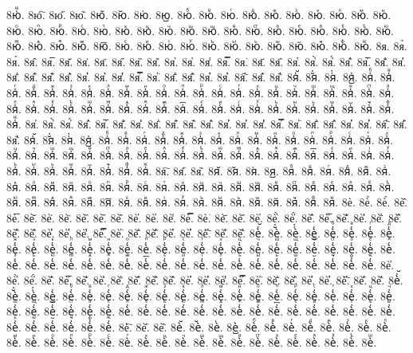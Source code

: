 {8ю҆ꚟ.
8ю҇.
8ю᷀.
8ю᷁.
8ю᷶.
8ю᷷.
8ю᷸.
8ю᷹.
8юⷠ.
8юⷡ.
8юⷢ.
8юⷣ.
8юⷤ.
8юⷥ.
8юⷦ.
8юⷧ.
8юⷨ.
8юⷩ.
8юⷪ.
8юⷫ.
8юⷬ.
8юⷭ.
8юⷮ.
8юⷯ.
8юⷰ.
8юⷱ.
8юⷲ.
8юⷳ.
8юⷴ.
8юⷵ.
8юⷶ.
8юⷷ.
8юⷸ.
8юⷹ.
8юⷺ.
8юⷻ.
8юⷼ.
8юⷽ.
8юⷾ.
8юⷿ.
8ю꙯.
8юꙴ.
8юꙵ.
8юꙶ.
8юꙷ.
8юꙸ.
8юꙹ.
8юꙺ.
8юꙻ.
8ю꙼.
8ю꙽.
8юꚞ.
8юꚟ.
8я.
8я̀.
8я́.
8я̂.
8я̅.
8я̆.
8я̇.
8я̈.
8я̋.
8я̏.
8я̑.
8я̓.
8я̔.
8я̾.
8я̿.
8я͘.
8я҃.
8я҄.
8я҅.
8я҅̀.
8я҅́.
8я҅̂.
8я҅̅.
8я҅̆.
8я҅̇.
8я҅̈.
8я҅̋.
8я҅̏.
8я҅̑.
8я҅̓.
8я҅̔.
8я҅̾.
8я҅̿.
8я҅͘.
8я҅҃.
8я҅҄.
8я҅҅.
8я҅҆.
8я҅҇.
8я҅᷀.
8я҅᷁.
8я҅᷶.
8я᷷҅.
8я᷸҅.
8я᷹҅.
8я҅ⷠ.
8я҅ⷡ.
8я҅ⷢ.
8я҅ⷣ.
8я҅ⷤ.
8я҅ⷥ.
8я҅ⷦ.
8я҅ⷧ.
8я҅ⷨ.
8я҅ⷩ.
8я҅ⷪ.
8я҅ⷫ.
8я҅ⷬ.
8я҅ⷭ.
8я҅ⷮ.
8я҅ⷯ.
8я҅ⷰ.
8я҅ⷱ.
8я҅ⷲ.
8я҅ⷳ.
8я҅ⷴ.
8я҅ⷵ.
8я҅ⷶ.
8я҅ⷷ.
8я҅ⷸ.
8я҅ⷹ.
8я҅ⷺ.
8я҅ⷻ.
8я҅ⷼ.
8я҅ⷽ.
8я҅ⷾ.
8я҅ⷿ.
8я҅꙯.
8я҅ꙴ.
8я҅ꙵ.
8я҅ꙶ.
8я҅ꙷ.
8я҅ꙸ.
8я҅ꙹ.
8я҅ꙺ.
8я҅ꙻ.
8я҅꙼.
8я҅꙽.
8я҅ꚞ.
8я҅ꚟ.
8я҆.
8я҆̀.
8я҆́.
8я҆̂.
8я҆̅.
8я҆̆.
8я҆̇.
8я҆̈.
8я҆̋.
8я҆̏.
8я҆̑.
8я҆̓.
8я҆̔.
8я҆̾.
8я҆̿.
8я҆͘.
8я҆҃.
8я҆҄.
8я҆҅.
8я҆҆.
8я҆҇.
8я҆᷀.
8я҆᷁.
8я҆᷶.
8я᷷҆.
8я᷸҆.
8я᷹҆.
8я҆ⷠ.
8я҆ⷡ.
8я҆ⷢ.
8я҆ⷣ.
8я҆ⷤ.
8я҆ⷥ.
8я҆ⷦ.
8я҆ⷧ.
8я҆ⷨ.
8я҆ⷩ.
8я҆ⷪ.
8я҆ⷫ.
8я҆ⷬ.
8я҆ⷭ.
8я҆ⷮ.
8я҆ⷯ.
8я҆ⷰ.
8я҆ⷱ.
8я҆ⷲ.
8я҆ⷳ.
8я҆ⷴ.
8я҆ⷵ.
8я҆ⷶ.
8я҆ⷷ.
8я҆ⷸ.
8я҆ⷹ.
8я҆ⷺ.
8я҆ⷻ.
8я҆ⷼ.
8я҆ⷽ.
8я҆ⷾ.
8я҆ⷿ.
8я҆꙯.
8я҆ꙴ.
8я҆ꙵ.
8я҆ꙶ.
8я҆ꙷ.
8я҆ꙸ.
8я҆ꙹ.
8я҆ꙺ.
8я҆ꙻ.
8я҆꙼.
8я҆꙽.
8я҆ꚞ.
8я҆ꚟ.
8я҇.
8я᷀.
8я᷁.
8я᷶.
8я᷷.
8я᷸.
8я᷹.
8яⷠ.
8яⷡ.
8яⷢ.
8яⷣ.
8яⷤ.
8яⷥ.
8яⷦ.
8яⷧ.
8яⷨ.
8яⷩ.
8яⷪ.
8яⷫ.
8яⷬ.
8яⷭ.
8яⷮ.
8яⷯ.
8яⷰ.
8яⷱ.
8яⷲ.
8яⷳ.
8яⷴ.
8яⷵ.
8яⷶ.
8яⷷ.
8яⷸ.
8яⷹ.
8яⷺ.
8яⷻ.
8яⷼ.
8яⷽ.
8яⷾ.
8яⷿ.
8я꙯.
8яꙴ.
8яꙵ.
8яꙶ.
8яꙷ.
8яꙸ.
8яꙹ.
8яꙺ.
8яꙻ.
8я꙼.
8я꙽.
8яꚞ.
8яꚟ.
8ѐ.
8ѐ̀.
8ѐ́.
8ѐ̂.
8ѐ̅.
8ѐ̆.
8ѐ̇.
8ѐ̈.
8ѐ̋.
8ѐ̏.
8ѐ̑.
8ѐ̓.
8ѐ̔.
8ѐ̾.
8ѐ̿.
8ѐ͘.
8ѐ҃.
8ѐ҄.
8ѐ҅.
8ѐ҅̀.
8ѐ҅́.
8ѐ҅̂.
8ѐ҅̅.
8ѐ҅̆.
8ѐ҅̇.
8ѐ҅̈.
8ѐ҅̋.
8ѐ҅̏.
8ѐ҅̑.
8ѐ҅̓.
8ѐ҅̔.
8ѐ҅̾.
8ѐ҅̿.
8ѐ҅͘.
8ѐ҅҃.
8ѐ҅҄.
8ѐ҅҅.
8ѐ҅҆.
8ѐ҅҇.
8ѐ҅᷀.
8ѐ҅᷁.
8ѐ҅᷶.
8ѐ᷷҅.
8ѐ᷸҅.
8ѐ᷹҅.
8ѐ҅ⷠ.
8ѐ҅ⷡ.
8ѐ҅ⷢ.
8ѐ҅ⷣ.
8ѐ҅ⷤ.
8ѐ҅ⷥ.
8ѐ҅ⷦ.
8ѐ҅ⷧ.
8ѐ҅ⷨ.
8ѐ҅ⷩ.
8ѐ҅ⷪ.
8ѐ҅ⷫ.
8ѐ҅ⷬ.
8ѐ҅ⷭ.
8ѐ҅ⷮ.
8ѐ҅ⷯ.
8ѐ҅ⷰ.
8ѐ҅ⷱ.
8ѐ҅ⷲ.
8ѐ҅ⷳ.
8ѐ҅ⷴ.
8ѐ҅ⷵ.
8ѐ҅ⷶ.
8ѐ҅ⷷ.
8ѐ҅ⷸ.
8ѐ҅ⷹ.
8ѐ҅ⷺ.
8ѐ҅ⷻ.
8ѐ҅ⷼ.
8ѐ҅ⷽ.
8ѐ҅ⷾ.
8ѐ҅ⷿ.
8ѐ҅꙯.
8ѐ҅ꙴ.
8ѐ҅ꙵ.
8ѐ҅ꙶ.
8ѐ҅ꙷ.
8ѐ҅ꙸ.
8ѐ҅ꙹ.
8ѐ҅ꙺ.
8ѐ҅ꙻ.
8ѐ҅꙼.
8ѐ҅꙽.
8ѐ҅ꚞ.
8ѐ҅ꚟ.
8ѐ҆.
8ѐ҆̀.
8ѐ҆́.
8ѐ҆̂.
8ѐ҆̅.
8ѐ҆̆.
8ѐ҆̇.
8ѐ҆̈.
8ѐ҆̋.
8ѐ҆̏.
8ѐ҆̑.
8ѐ҆̓.
8ѐ҆̔.
8ѐ҆̾.
8ѐ҆̿.
8ѐ҆͘.
8ѐ҆҃.
8ѐ҆҄.
8ѐ҆҅.
8ѐ҆҆.
8ѐ҆҇.
8ѐ҆᷀.
8ѐ҆᷁.
8ѐ҆᷶.
8ѐ᷷҆.
8ѐ᷸҆.
8ѐ᷹҆.
8ѐ҆ⷠ.
8ѐ҆ⷡ.
8ѐ҆ⷢ.
8ѐ҆ⷣ.
8ѐ҆ⷤ.
8ѐ҆ⷥ.
8ѐ҆ⷦ.
8ѐ҆ⷧ.
8ѐ҆ⷨ.
8ѐ҆ⷩ.
8ѐ҆ⷪ.
8ѐ҆ⷫ.
8ѐ҆ⷬ.
8ѐ҆ⷭ.
8ѐ҆ⷮ.
8ѐ҆ⷯ.
8ѐ҆ⷰ.
8ѐ҆ⷱ.
8ѐ҆ⷲ.
8ѐ҆ⷳ.
8ѐ҆ⷴ.
8ѐ҆ⷵ.
8ѐ҆ⷶ.
8ѐ҆ⷷ.
8ѐ҆ⷸ.
8ѐ҆ⷹ.
8ѐ҆ⷺ.
8ѐ҆ⷻ.
8ѐ҆ⷼ.
8ѐ҆ⷽ.
8ѐ҆ⷾ.
8ѐ҆ⷿ.
8ѐ҆꙯.
8ѐ҆ꙴ.
8ѐ҆ꙵ.
8ѐ҆ꙶ.
8ѐ҆ꙷ.
8ѐ҆ꙸ.
8ѐ҆ꙹ.
8ѐ҆ꙺ.
8ѐ҆ꙻ.
8ѐ҆꙼.
8ѐ҆꙽.
8ѐ҆ꚞ.
8ѐ҆ꚟ.
8ѐ҇.
8ѐ᷀.
8ѐ᷁.
8ѐ᷶.
8ѐ᷷.
8ѐ᷸.
8ѐ᷹.
8ѐⷠ.
8ѐⷡ.
8ѐⷢ.
8ѐⷣ.
8ѐⷤ.
8ѐⷥ.
8ѐⷦ.
8ѐⷧ.
8ѐⷨ.
8ѐⷩ.
8ѐⷪ.
8ѐⷫ.
8ѐⷬ.
8ѐⷭ.
8ѐⷮ.
8ѐⷯ.
8ѐⷰ.
8ѐⷱ.
8ѐⷲ.
8ѐⷳ.
8ѐⷴ.
8ѐⷵ.
8ѐⷶ.
8ѐⷷ.
8ѐⷸ.
8ѐⷹ.
8ѐⷺ.
8ѐⷻ.
}
